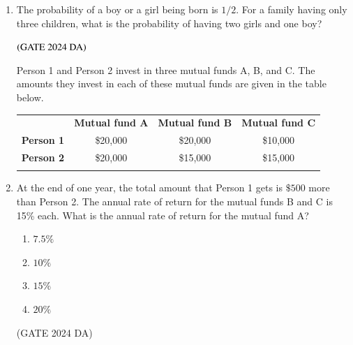 \documentclass[journal,12pt,onecolumn]{IEEEtran}
\theoremstyle{remark}
\begin{document}
\begin{enumerate}
\item The probability of a boy or a girl being born is $1/2$. For a family having only three children, what is the probability of having two girls and one boy?
\begin{enumerate}
\end{enumerate}
\hfill $\left(\text{GATE 2024 DA}\right)$

\noindent Person 1 and Person 2 invest in three mutual funds A, B, and C. The amounts they invest in each of these mutual funds are given in the table below.
\begin{center}
\begin{tabular}{|l|c|c|c|}
\hhline{~---}
\multicolumn{1}{c|}{} & \textbf{Mutual fund A} & \textbf{Mutual fund B} & \textbf{Mutual fund C} \\ 
\hhline{----}
\textbf{Person 1} & \$20,000 & \$20,000 & \$10,000 \\ 
\hhline{----}
\textbf{Person 2} & \$20,000 & \$15,000 & \$15,000 \\ 
\hhline{----}
\end{tabular} 
\end{center}


\item  At the end of one year, the total amount that Person 1 gets is $\$500$ more than Person 2. The annual rate of return for the mutual funds B and C is 15\% each. What is the annual rate of return for the mutual fund A?
\begin{multicols}{4}
  \begin{enumerate}
\item $7.5\%$
\item $10\%$
\item $15\%$
\item $ 20\%$
\end{enumerate}  
\end{multicols}

\hfill (GATE 2024 DA)



\end{enumerate}
\end{document}
